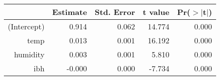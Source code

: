 \begin{table}[ht]
\centering
\begin{tabular}{rrrrr}
  \hline
 & Estimate & Std. Error & t value & Pr($>$$|$t$|$) \\ 
  \hline
(Intercept) & 0.914 & 0.062 & 14.774 & 0.000 \\ 
  temp & 0.013 & 0.001 & 16.192 & 0.000 \\ 
  humidity & 0.003 & 0.001 & 5.810 & 0.000 \\ 
  ibh & -0.000 & 0.000 & -7.734 & 0.000 \\ 
   \hline
\end{tabular}
\end{table}
